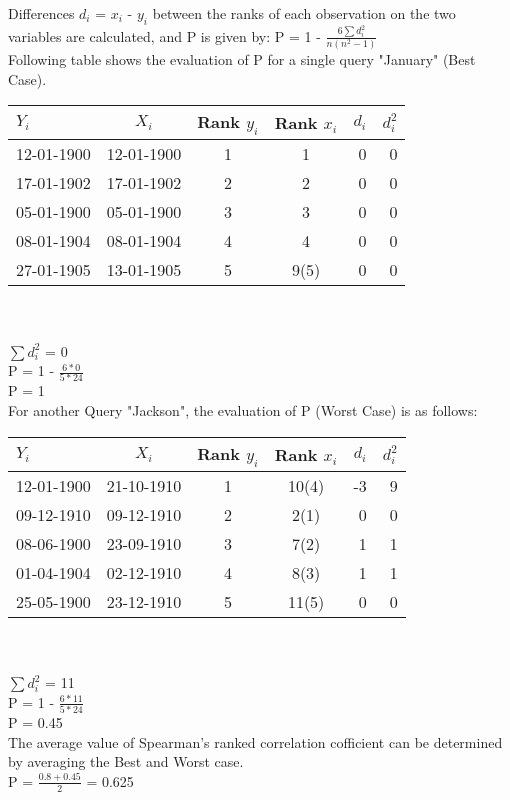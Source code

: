 \documentclass[10pt, conference, compsocconf]{IEEEtran}
\begin{document}
Differences $d_{i}$ = $x_{i}$ - $y_{i}$  between the ranks of each observation on the two variables are calculated, and P is given by:
P = 1 - $\frac {6\sum d_i^2 }{n(n^2-1)}$ \\

Following table shows the evaluation of P for a single query "January" (Best Case).

\begin{tabular}{ l | c | c | c | r | r }
$Y_{i}$ & $X_{i}$ & Rank $y_{i}$ & Rank $x_{i}$ & $d_{i}$ & $d_{i}^2$ \\
\hline
  12-01-1900 & 12-01-1900 & 1 & 1 & 0 & 0 \\
  17-01-1902 & 17-01-1902 & 2 & 2 & 0 & 0 \\
  05-01-1900 & 05-01-1900 & 3 & 3 & 0 & 0 \\
  08-01-1904 & 08-01-1904 & 4 & 4 & 0 & 0 \\
  27-01-1905 & 13-01-1905 & 5 & 9(5) & 0 & 0 \\
\end{tabular}
\\
\\
${\sum d_i^2}$ = 0 \\
P = 1 - $\frac{6*0}{5*24}$ \\
P = 1 \\

For another Query "Jackson", the evaluation of P (Worst Case) is as follows:

\begin{tabular}{ l | c | c | c | r | r }
 $Y_{i}$ & $X_{i}$ & Rank $y_{i}$ & Rank $x_{i}$ & $d_{i}$ & $d_{i}^2$ \\
\hline
  12-01-1900 & 21-10-1910 & 1 & 10(4) & -3 & 9 \\
  09-12-1910 & 09-12-1910 & 2 & 2(1) & 0 & 0 \\
  08-06-1900 & 23-09-1910 & 3 & 7(2) & 1 & 1 \\
  01-04-1904 & 02-12-1910 & 4 & 8(3) & 1 & 1 \\
  25-05-1900 & 23-12-1910 & 5 & 11(5) & 0 & 0 \\
\end{tabular}
\\
\\
${\sum d_i^2}$ = 11 \\
P = 1 - $\frac{6*11}{5*24}$ \\
P = 0.45 \\

The average value of Spearman's ranked correlation cofficient can be determined by averaging the Best and Worst case. \\
P = $\frac {0.8+0.45}{2}$ = 0.625 \\
\end{document}

